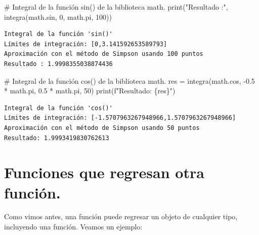 \documentclass[
  spanish,
  letterpaper,
]{scrbook}
\newenvironment{Shaded}{\begin{snugshade}}{\end{snugshade}}
\newcommand{\BuiltInTok}[1]{\textcolor[rgb]{0.00,0.23,0.31}{#1}}
\newcommand{\CommentTok}[1]{\textcolor[rgb]{0.37,0.37,0.37}{#1}}
\newcommand{\DecValTok}[1]{\textcolor[rgb]{0.68,0.00,0.00}{#1}}
\newcommand{\FloatTok}[1]{\textcolor[rgb]{0.68,0.00,0.00}{#1}}
\newcommand{\NormalTok}[1]{\textcolor[rgb]{0.00,0.23,0.31}{#1}}
\newcommand{\OperatorTok}[1]{\textcolor[rgb]{0.37,0.37,0.37}{#1}}
\newcommand{\SpecialCharTok}[1]{\textcolor[rgb]{0.37,0.37,0.37}{#1}}
\newcommand{\SpecialStringTok}[1]{\textcolor[rgb]{0.13,0.47,0.30}{#1}}
\newcommand{\StringTok}[1]{\textcolor[rgb]{0.13,0.47,0.30}{#1}}
\theoremstyle{definition}
\theoremstyle{remark}
\begin{document}
\begin{Shaded}
\begin{Highlighting}[]
\CommentTok{\# Integral de la función sin() de la biblioteca math.}
\BuiltInTok{print}\NormalTok{(}\StringTok{"Resultado :"}\NormalTok{, integra(math.sin, }\DecValTok{0}\NormalTok{, math.pi, }\DecValTok{100}\NormalTok{))}
\end{Highlighting}
\end{Shaded}

\begin{verbatim}
Integral de la función 'sin()'
Límites de integración: [0,3.141592653589793]
Aproximación con el método de Simpson usando 100 puntos
Resultado : 1.9998355038874436
\end{verbatim}

\begin{Shaded}
\begin{Highlighting}[]
\CommentTok{\# Integral de la función cos() de la biblioteca math.}
\NormalTok{res }\OperatorTok{=}\NormalTok{ integra(math.cos, }\OperatorTok{{-}}\FloatTok{0.5} \OperatorTok{*}\NormalTok{ math.pi, }\FloatTok{0.5} \OperatorTok{*}\NormalTok{ math.pi, }\DecValTok{50}\NormalTok{)}
\BuiltInTok{print}\NormalTok{(}\SpecialStringTok{f"Resultado: }\SpecialCharTok{\{}\NormalTok{res}\SpecialCharTok{\}}\SpecialStringTok{"}\NormalTok{)}
\end{Highlighting}
\end{Shaded}

\begin{verbatim}
Integral de la función 'cos()'
Límites de integración: [-1.5707963267948966,1.5707963267948966]
Aproximación con el método de Simpson usando 50 puntos
Resultado: 1.9993419830762613
\end{verbatim}

\section{Funciones que regresan otra
función.}\label{funciones-que-regresan-otra-funciuxf3n.}

Como vimos antes, una función puede regresar un objeto de cualquier
tipo, incluyendo una función. Veamos un ejemplo:
\end{document}
